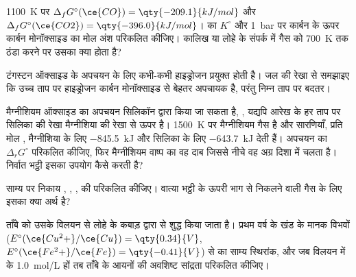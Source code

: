 \begin{exercise}[$\star\star$]\label{exo:b2:ellingham:8}
\qty{1100}{K} पर $\Delta_f G^\circ(\ce{CO}) = \qty{-209.1}{kJ/mol}$ और
$\Delta_f G^\circ(\ce{CO2}) = \qty{-396.0}{kJ/mol}$।  का
$K^\circ$ और \qty{1}{bar} पर कार्बन के ऊपर कार्बन मोनॉक्साइड का मोल अंश परिकलित कीजिए।
कालिख या लोहे के संपर्क में गैस को \qty{700}{K} तक ठंडा करने पर
उसका क्या होता है?
\end{exercise}

\begin{exercise}[$\star\star$]\label{exo:b2:ellingham:9}
टंगस्टन ऑक्साइड के अपचयन के लिए कभी-कभी हाइड्रोजन प्रयुक्त होती है। जल की रेखा से
समझाइए कि उच्च ताप पर हाइड्रोजन कार्बन मोनॉक्साइड से बेहतर अपचायक है, परंतु
निम्न ताप पर बदतर।
\end{exercise}

\begin{exercise}[$\star\star\star$]\label{exo:b2:ellingham:10}
मैग्नीशियम ऑक्साइड का अपचयन सिलिकॉन द्वारा किया जा सकता है, , यद्यपि
आरेख के हर ताप पर सिलिका की रेखा मैग्नीशिया की रेखा से ऊपर है।
\qty{1500}{K} पर मैग्नीशियम गैस है और सारणियाँ, प्रति मोल
, मैग्नीशिया के लिए \qty{-845.5}{kJ} और सिलिका के लिए \qty{-643.7}{kJ} देती हैं।
अपचयन का $\Delta_r G^\circ$ परिकलित कीजिए, फिर मैग्नीशियम वाष्प का वह दाब
जिससे नीचे वह अग्र दिशा में चलता है। निर्वात भट्ठी इसका उपयोग कैसे करती है?
\end{exercise}

\begin{exercise}[$\star\star\star$]\label{exo:b2:ellingham:11}
साम्य पर निकाय , , ,
 की  परिकलित कीजिए। वात्या भट्ठी के ऊपरी भाग से निकलने वाली
गैस के लिए इसका क्या अर्थ है?
\end{exercise}

\begin{exercise}[$\star\star\star$]\label{exo:b2:ellingham:12}
ताँबे को उसके  विलयन से लोहे के कबाड़ द्वारा  से शुद्ध किया जाता है।
प्रथम वर्ष के खंड के मानक विभवों ($E^\circ(\ce{Cu^2+}/\ce{Cu})
= \qty{0.34}{V}$, $E^\circ(\ce{Fe^2+}/\ce{Fe}) = \qty{-0.41}{V}$) से
 का साम्य स्थिरांक, और जब विलयन में  के
\qty{1.0}{mol/L} हों तब ताँबे के आयनों की अवशिष्ट
सांद्रता परिकलित कीजिए।
\end{exercise}

